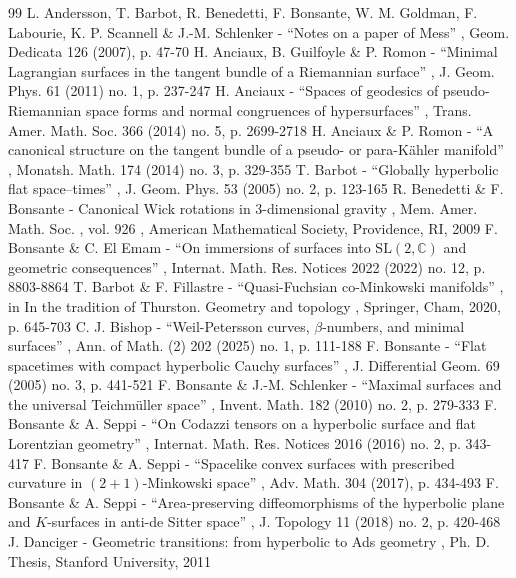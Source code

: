 \documentclass[10pt]{amsart}
\theoremstyle{plain}
\theoremstyle{definition}
\begin{document}
\begin{thebibliography}{99}
 L. Andersson, T. Barbot, R. Benedetti, F. Bonsante, W. M. Goldman, F. Labourie, K. P. Scannell \& J.-M. Schlenker - “Notes on a paper of Mess” , Geom. Dedicata 126 (2007), p. 47-70
 H. Anciaux, B. Guilfoyle \& P. Romon - “Minimal Lagrangian surfaces in the tangent bundle of a Riemannian surface” , J. Geom. Phys. 61 (2011) no. 1, p. 237-247
 H. Anciaux - “Spaces of geodesics of pseudo-Riemannian space forms and normal congruences of hypersurfaces” , Trans. Amer. Math. Soc. 366 (2014) no. 5, p. 2699-2718
 H. Anciaux \& P. Romon - “A canonical structure on the tangent bundle of a pseudo- or para-Kähler manifold” , Monatsh. Math. 174 (2014) no. 3, p. 329-355
 T. Barbot - “Globally hyperbolic flat space–times” , J. Geom. Phys. 53 (2005) no. 2, p. 123-165
 R. Benedetti \& F. Bonsante - Canonical Wick rotations in $3$-dimensional gravity , Mem. Amer. Math. Soc. , vol. 926 , American Mathematical Society, Providence, RI, 2009
 F. Bonsante \& C. El Emam - “On immersions of surfaces into $\mathrm{SL}(2,\mathbb{C})$ and geometric consequences” , Internat. Math. Res. Notices 2022 (2022) no. 12, p. 8803-8864
 T. Barbot \& F. Fillastre - “Quasi-Fuchsian co-Minkowski manifolds” , in In the tradition of Thurston. Geometry and topology , Springer, Cham, 2020, p. 645-703
 C. J. Bishop - “Weil-Petersson curves, $\beta $-numbers, and minimal surfaces” , Ann. of Math. (2) 202 (2025) no. 1, p. 111-188
 F. Bonsante - “Flat spacetimes with compact hyperbolic Cauchy surfaces” , J. Differential Geom. 69 (2005) no. 3, p. 441-521
 F. Bonsante \& J.-M. Schlenker - “Maximal surfaces and the universal Teichmüller space” , Invent. Math. 182 (2010) no. 2, p. 279-333
 F. Bonsante \& A. Seppi - “On Codazzi tensors on a hyperbolic surface and flat Lorentzian geometry” , Internat. Math. Res. Notices 2016 (2016) no. 2, p. 343-417
 F. Bonsante \& A. Seppi - “Spacelike convex surfaces with prescribed curvature in $(2+1)$-Minkowski space” , Adv. Math. 304 (2017), p. 434-493
 F. Bonsante \& A. Seppi - “Area-preserving diffeomorphisms of the hyperbolic plane and $K$-surfaces in anti-de Sitter space” , J. Topology 11 (2018) no. 2, p. 420-468
 J. Danciger - Geometric transitions: from hyperbolic to Ads geometry , Ph. D. Thesis, Stanford University, 2011

\end{thebibliography}
\end{document}
